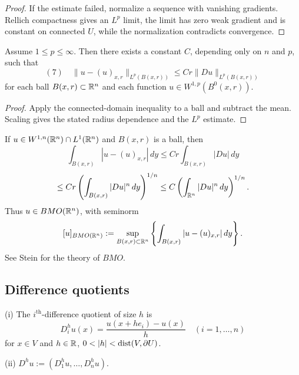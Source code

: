 \begin{proof}
\sketch If the estimate failed, normalize a sequence with vanishing gradients. Rellich compactness gives an $L^p$ limit, the limit has zero weak gradient and is constant on connected $U$, while the normalization contradicts convergence.
\end{proof}

\begin{theorem}
\label{thm:poincares-inequality-ball}

Assume $1 \le p \le \infty$. Then there exists a constant $C$, depending only on $n$ and $p$, such that
$$(7) \quad \|u - (u)_{x,r}\|_{L^p(B(x,r))} \le Cr\|Du\|_{L^p(B(x,r))}$$
for each ball $B(x,r) \subset \mathbb{R}^n$ and each function $u \in W^{1,p}(B^0(x,r))$.
\end{theorem}

\begin{proof}
\sketch Apply the connected-domain inequality to a ball and subtract the mean. Scaling gives the stated radius dependence and the $L^p$ estimate.
\end{proof}

\begin{remark}
\label{rem:bmo-remark}

If $u \in W^{1,n}(\mathbb{R}^n) \cap L^1(\mathbb{R}^n)$ and $B(x,r)$ is a ball, then
$$\int_{B(x,r)} |u - (u)_{x,r}|\, dy \le Cr\int_{B(x,r)} |Du|\, dy$$
$$\le Cr \left(\int_{B(x,r)} |Du|^n\, dy\right)^{1/n} \le C\left(\int_{\mathbb{R}^n} |Du|^n\, dy\right)^{1/n}.$$
Thus $u \in BMO(\mathbb{R}^n)$, with seminorm
$$[u]_{BMO(\mathbb{R}^n)} := \sup_{B(x,r) \subset \mathbb{R}^n} \left\{\int_{B(x,r)} |u - (u)_{x,r}|\, dy\right\}.$$
See Stein \cite{Stein1993} for the theory of $BMO$.
\end{remark}

\subsection{Difference quotients}

\begin{definition}
\label{def:difference-quotients}
(i) The $i^{\text{th}}$-difference quotient of size $h$ is
$$D_i^h u(x) = \frac{u(x + he_i) - u(x)}{h} \quad (i = 1, \ldots, n)$$
for $x \in V$ and $h \in \mathbb{R}$, $0 < |h| < \operatorname{dist}(V, \partial U)$.

(ii) $D^h u := (D_1^h u, \ldots, D_n^h u)$.
\end{definition}

